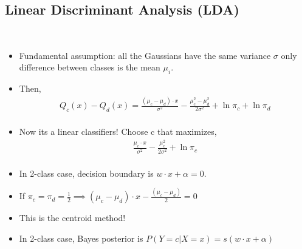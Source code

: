 \documentclass[10pt]{article}
\begin{document}
	\subsection*{Linear Discriminant Analysis (LDA)}
		\
		\begin{itemize}
			\item Fundamental assumption: all the Gaussians have the same variance $\sigma$ only difference between classes is the mean $\mu_{i}$.
			\item Then,
				\begin{align*}
					Q_{c}(x) - Q_{d}(x) = \frac{(\mu_{c}-\mu_{d})\cdot x}{\sigma^{2}} - \frac{\mu_{c}^{2}-\mu_{d}^{2}}{2\sigma^{2}} + \ln \pi_{c} + \ln \pi_{d}\\
				\end{align*}
			\item Now its a linear classifiers! Choose c that maximizes,
				\begin{align*}
					\frac{\mu_{c}\cdot x}{\sigma^{2}} - \frac{\mu_{c}^{2}}{2\sigma^{2}} + \ln \pi_{c}\\
				\end{align*}
			\item In 2-class case, decision boundary is $w \cdot x + \alpha = 0$.
			\item If $\pi_{c} = \pi_{d} = \frac{1}{2} \implies (\mu_{c} - \mu_{d})\cdot x - \frac{(\mu_{c}-\mu_{d})}{2} = 0$
			\item This is the centroid method!
			\item In 2-class case, Bayes posterior is $P(Y=c|X=x) = s(w\cdot x + \alpha)$
		\end{itemize}
	
\end{document}
